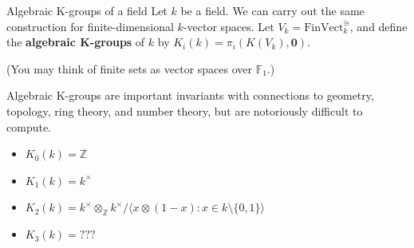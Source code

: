 \documentclass[12pt]{beamer}
\begin{document}
\begin{frame}{Algebraic K-groups of a field}
  Let $k$ be a field. We can carry out the same construction for finite-dimensional $k$-vector spaces. Let $V_k=\mathrm{FinVect}_k^{\cong}$, and define the \textbf{algebraic K-groups} of $k$ by $K_i(k)=\pi_i (K(V_k),\mathbf{0})$.

(You may think of finite sets as vector spaces over $\mathbb{F}_1$.)

\pause
Algebraic K-groups are important invariants with connections to geometry, topology, ring theory, and number theory, but are notoriously difficult to compute.
\pause
\begin{itemize}
  \item $K_0(k)=\mathbb{Z}$
  \item $K_1(k)=k^{\times}$
  \item $K_2(k)=k^{\times}\otimes_{\mathbb{Z}} k^{\times}/ \langle x\otimes (1-x): x\in k\setminus \{0,1\} \rangle$
    \pause
  \item $K_3(k)=???$
\end{itemize}
\end{frame}
\end{document}
